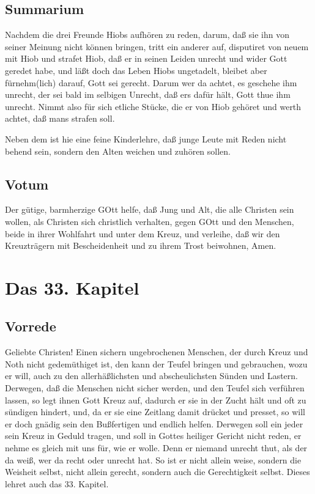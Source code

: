 \section{Summarium}

Nachdem die drei Freunde Hiobs aufhören zu reden, darum, daß sie ihn von seiner Meinung nicht können bringen, tritt ein anderer auf, disputiret von neuem mit Hiob und strafet Hiob, daß er in seinen Leiden unrecht und wider Gott geredet habe, und läßt doch das Leben Hiobs ungetadelt, bleibet aber fürnehm(lich) darauf, Gott sei gerecht. Darum wer da achtet, es geschehe ihm unrecht, der sei bald im selbigen Unrecht, daß ers dafür hält, Gott thue ihm unrecht. Nimmt also für sich etliche Stücke, die er von Hiob gehöret und werth achtet, daß mans strafen soll.

Neben dem ist hie eine feine Kinderlehre, daß junge Leute mit Reden nicht behend sein, sondern den Alten weichen und zuhören sollen.

\section{Votum}

Der gütige, barmherzige GOtt helfe, daß Jung und Alt, die alle Christen sein wollen, als Christen sich christlich verhalten, gegen GOtt und den Menschen, beide in ihrer Wohlfahrt und unter dem Kreuz, und verleihe, daß wir den Kreuzträgern mit Bescheidenheit und zu ihrem Trost beiwohnen, Amen.

\chapter{Das 33. Kapitel}

\section{Vorrede}

Geliebte Christen! Einen sichern ungebrochenen Menschen, der durch Kreuz und Noth nicht gedemüthiget ist, den kann der Teufel bringen und gebrauchen, wozu er will, auch zu den allerhäßlichsten und abscheulichsten Sünden und Lastern. Derwegen, daß die Menschen nicht sicher werden, und den Teufel sich verführen lassen, so legt ihnen Gott Kreuz auf, dadurch er sie in der Zucht hält und oft zu sündigen hindert, und, da er sie eine Zeitlang damit drücket und presset, so will er doch gnädig sein den Bußfertigen und endlich helfen. Derwegen soll ein jeder sein Kreuz in Geduld tragen, und soll in Gottes heiliger Gericht nicht reden, er nehme es gleich mit uns für, wie er wolle. Denn er niemand unrecht thut, als der da weiß, wer da recht oder unrecht hat. So ist er nicht allein weise, sondern die Weisheit selbst, nicht allein gerecht, sondern auch die Gerechtigkeit selbst. Dieses lehret auch das 33. Kapitel.

